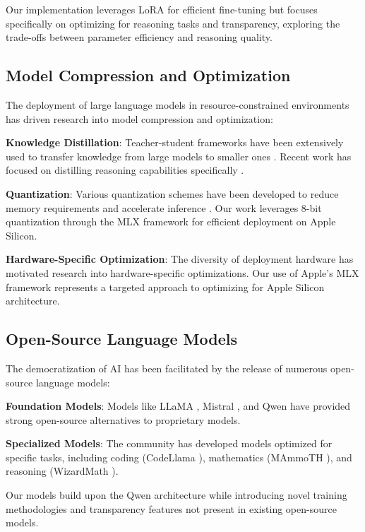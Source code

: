 Our implementation leverages LoRA for efficient fine-tuning but focuses specifically on optimizing for reasoning tasks and transparency, exploring the trade-offs between parameter efficiency and reasoning quality.

\subsection{Model Compression and Optimization}

The deployment of large language models in resource-constrained environments has driven research into model compression and optimization:

\textbf{Knowledge Distillation}: Teacher-student frameworks have been extensively used to transfer knowledge from large models to smaller ones \cite{hinton2015distilling}. Recent work has focused on distilling reasoning capabilities specifically \cite{magister2022teaching}.

\textbf{Quantization}: Various quantization schemes have been developed to reduce memory requirements and accelerate inference \cite{jacob2018quantization}. Our work leverages 8-bit quantization through the MLX framework for efficient deployment on Apple Silicon.

\textbf{Hardware-Specific Optimization}: The diversity of deployment hardware has motivated research into hardware-specific optimizations. Our use of Apple's MLX framework represents a targeted approach to optimizing for Apple Silicon architecture.

\subsection{Open-Source Language Models}

The democratization of AI has been facilitated by the release of numerous open-source language models:

\textbf{Foundation Models}: Models like LLaMA \cite{touvron2023llama}, Mistral \cite{jiang2023mistral}, and Qwen \cite{bai2023qwen} have provided strong open-source alternatives to proprietary models.

\textbf{Specialized Models}: The community has developed models optimized for specific tasks, including coding (CodeLlama \cite{roziere2023code}), mathematics (MAmmoTH \cite{yue2023mammoth}), and reasoning (WizardMath \cite{luo2023wizardmath}).

Our models build upon the Qwen architecture while introducing novel training methodologies and transparency features not present in existing open-source models.

